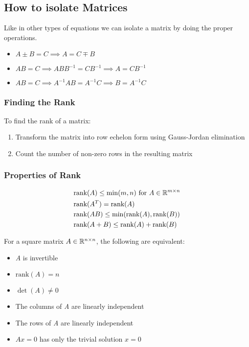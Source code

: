 \subsection{How to isolate Matrices}

Like in other types of equations we can isolate a matrix by doing the proper operations.

\begin{itemize}
    \item \(A \pm B = C \implies A = C \mp B\) 
    \item \(AB = C \implies ABB^{-1} = CB^{-1}  \implies A = CB^{-1}\)
    \item \(AB = C \implies A^{-1}AB = A^{-1}C  \implies B = A^{-1}C\)
\end{itemize}


\subsubsection{Finding the Rank}

To find the rank of a matrix:
\begin{enumerate}
    \item Transform the matrix into row echelon form using Gauss-Jordan elimination
    \item Count the number of non-zero rows in the resulting matrix
\end{enumerate}

\subsubsection{Properties of Rank}

\begin{align*}
    &\text{rank}(A) \leq \min(m,n) \text{ for } A \in \mathbb{R}^{m \times n} \\
    &\text{rank}(A^T) = \text{rank}(A) \\
    &\text{rank}(AB) \leq \min(\text{rank}(A), \text{rank}(B)) \\
    &\text{rank}(A+B) \leq \text{rank}(A) + \text{rank}(B)
\end{align*}

For a square matrix \(A \in \mathbb{R}^{n \times n}\), the following are equivalent:

\begin{itemize}
    \item \emph{A} is invertible
    \item \(\text{rank}(A) = n\)
    \item \(\det(A) \neq 0\)
    \item The columns of \emph{A} are linearly independent
    \item The rows of \emph{A} are linearly independent
    \item \(Ax = 0\) has only the trivial solution \(x = 0\)
\end{itemize}

